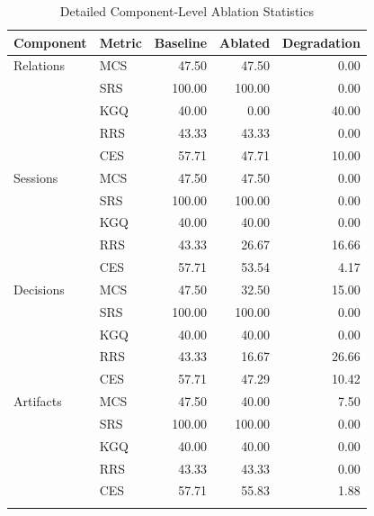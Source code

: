 \begin{table}[htbp]
\centering
\caption{Detailed Component-Level Ablation Statistics}
\label{tab:crme-component-statistics}
\begin{tabular}{llrrr}
\toprule
Component & Metric & Baseline & Ablated & Degradation \\
\midrule
Relations & MCS & 47.50 & 47.50 & 0.00 \\\n & SRS & 100.00 & 100.00 & 0.00 \\\n & KGQ & 40.00 & 0.00 & 40.00 \\\n & RRS & 43.33 & 43.33 & 0.00 \\\n & CES & 57.71 & 47.71 & 10.00 \\\n\midrule
Sessions & MCS & 47.50 & 47.50 & 0.00 \\\n & SRS & 100.00 & 100.00 & 0.00 \\\n & KGQ & 40.00 & 40.00 & 0.00 \\\n & RRS & 43.33 & 26.67 & 16.66 \\\n & CES & 57.71 & 53.54 & 4.17 \\\n\midrule
Decisions & MCS & 47.50 & 32.50 & 15.00 \\\n & SRS & 100.00 & 100.00 & 0.00 \\\n & KGQ & 40.00 & 40.00 & 0.00 \\\n & RRS & 43.33 & 16.67 & 26.66 \\\n & CES & 57.71 & 47.29 & 10.42 \\\n\midrule
Artifacts & MCS & 47.50 & 40.00 & 7.50 \\\n & SRS & 100.00 & 100.00 & 0.00 \\\n & KGQ & 40.00 & 40.00 & 0.00 \\\n & RRS & 43.33 & 43.33 & 0.00 \\\n & CES & 57.71 & 55.83 & 1.88 \\\n\midrule
\bottomrule
\end{tabular}
\end{table}
